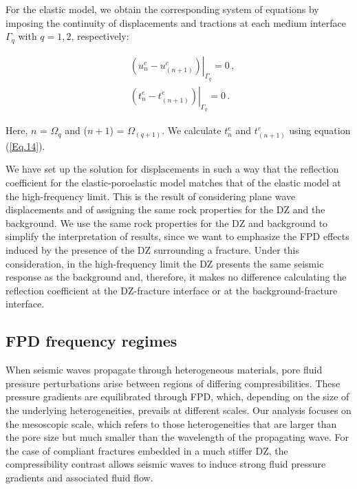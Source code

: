 \documentclass[draft]{agujournal2019}
\begin{document}
For the elastic model, we obtain the corresponding system of equations by imposing the continuity of displacements and tractions  at each medium interface $\Gamma_q$ with $q=1,2$, respectively:
\begin{linenomath*}
\begin{equation}\label{Eq.18}
\begin{split}
&  \left. \left(  u_n^e -  u_{(n+1)}^e \right) \right \rvert_{\Gamma_q} = 0 \,, \\
&  \left. \left( t_n^e  - t_{(n+1)}^e  \right) \right \rvert_{\Gamma_q} = 0 \,.
\end{split}
\end{equation}
\end{linenomath*}
Here, $n$ = $\Omega_q$ and ($n+1$) = $\Omega_{(q+1)}$. We calculate $t_n^e$  and $t_{(n+1)}^e$ using equation (\ref{Eq.14}).
 
We have set up the solution for displacements  in such a way that the reflection coefficient for the elastic-poroelastic model matches that of the elastic model at the high-frequency limit. This is the result of considering plane wave displacements and of assigning the same rock properties for the DZ and the background.
We use the same rock properties for the DZ and background to simplify the interpretation of results, since we want to emphasize the FPD effects induced by the presence of the DZ surrounding a fracture.
Under this consideration, in the high-frequency limit the DZ presents the same seismic response as the background and, therefore, it  makes no difference calculating the reflection coefficient at the DZ-fracture interface or at the background-fracture interface.

\subsection{FPD frequency regimes}
When seismic waves propagate through heterogeneous materials, pore fluid pressure perturbations arise between regions of differing compresibilities. These pressure gradients are equilibrated through FPD, which, depending on the size of the underlying heterogeneities, prevails at different scales. Our analysis focuses on the mesoscopic scale, which refers to those heterogeneities that are larger than the pore size but much smaller than the wavelength of the propagating wave. For the case of compliant fractures embedded in a much stiffer DZ, the compressi\-bility contrast allows seismic waves to induce strong fluid pressure gradients and  associated fluid flow.
\end{document}
